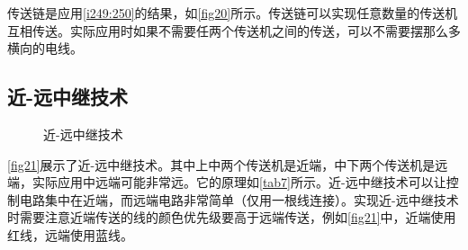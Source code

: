 传送链是应用\autoref{i249:250}的结果，如\autoref{fig20}所示。传送链可以实现任意数量的传送机互相传送。实际应用时如果不需要任两个传送机之间的传送，可以不需要摆那么多横向的电线。

\subsection{近-远中继技术}\label{sec16}
\begin{figure}[!ht]
\centering
{}
\qquad
{}
\caption{近-远中继技术}
\end{figure}
\autoref{fig21}展示了近-远中继技术。其中上中两个传送机是近端，中下两个传送机是远端，实际应用中远端可能非常远。它的原理如\autoref{tab7}所示。近-远中继技术可以让控制电路集中在近端，而远端电路非常简单（仅用一根线连接）。实现近-远中继技术时需要注意近端传送的线的颜色优先级要高于远端传送，例如\autoref{fig21}中，近端使用红线，远端使用蓝线。

